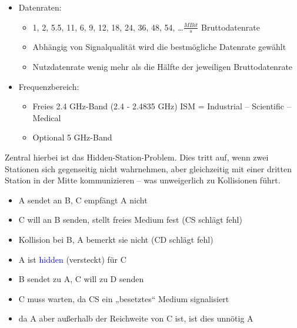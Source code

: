 \begin{itemize}
    \item Datenraten:
    \begin{itemize}
        \item 1, 2, 5.5, 11, 6, 9, 12, 18, 24, 36, 48, 54, \ldots $\frac{MBit}{s}$ Bruttodatenrate
        \item Abhängig von Signalqualität wird die bestmögliche Datenrate gewählt
        \item Nutzdatenrate wenig mehr als die Hälfte der jeweiligen Bruttodatenrate
    \end{itemize}
    \item Frequenzbereich:
    \begin{itemize}
        \item Freies 2.4 GHz-Band (2.4 - 2.4835 GHz) ISM = Industrial – Scientific – Medical
        \item Optional 5 GHz-Band
    \end{itemize}
\end{itemize}

Zentral hierbei ist das Hidden-Station-Problem.
Dies tritt auf, wenn zwei Stationen sich gegenseitig nicht wahrnehmen, aber gleichzeitig mit einer dritten Station in der Mitte kommunizieren – was unweigerlich zu Kollisionen führt.

\begin{itemize}
    \item A sendet an B, C empfängt A nicht
    \item C will an B senden, stellt freies Medium fest (CS schlägt fehl)
    \item Kollision bei B, A bemerkt sie nicht (CD schlägt fehl)
    \item A ist \textcolor{blue}{hidden} (versteckt) für C
\end{itemize}

\begin{itemize}
    \item B sendet zu A, C will zu D senden
    \item C muss warten, da CS ein „besetztes“ Medium signalisiert
    \item da A aber außerhalb der Reichweite von C ist, ist dies unnötig A
\end{itemize}

